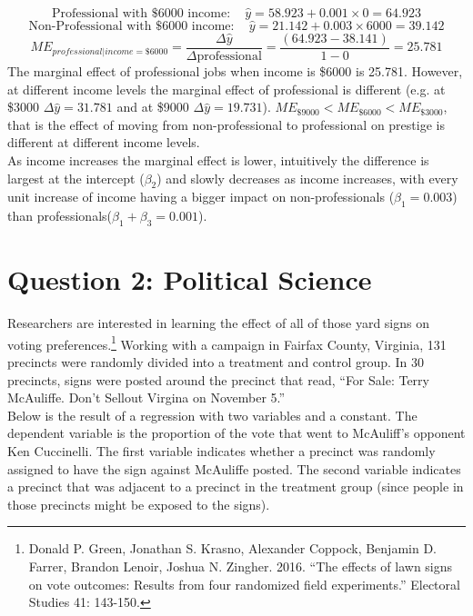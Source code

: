 \documentclass[12pt,letterpaper]{article}
\begin{document}
\begin{enumerate}
	\begin{equation}
		\text{Professional with \$6000 income}: \quad \hat{y} = 58.923 + 0.001 \times 0 = 64.923
	\end{equation}
	\begin{equation}
		\text{Non-Professional with \$6000 income}: \quad \hat{y} = 21.142 + 0.003 \times 6000 = 39.142
	\end{equation}
	\begin{equation}
		ME_{professional|income=\$6000} = \frac{\Delta\hat{y}}{\Delta\text{professional}} = \frac{(64.923-38.141)}{1-0} = 25.781
	\end{equation}
	The marginal effect of professional jobs when income is \$6000 is 25.781. 
	However, at different income levels the marginal effect of professional is different (e.g. at \$3000  $\Delta\hat{y}= 31.781$ and at \$9000 $\Delta\hat{y} = 19.731$).  
	$ ME_{\$9000} < ME_{\$6000} < ME_{\$3000}$, that is the effect of moving from non-professional to professional on prestige is different at different income levels.\\ As income increases the marginal effect is lower, intuitively the difference is largest at the intercept ($\beta_2$) and slowly decreases as income increases, with every unit increase of income having a bigger impact on non-professionals ($\beta_1 = 0.003$) than professionals($\beta_1 + \beta_3 = 0.001$).  
	
	
\end{enumerate}

\newpage

\section*{Question 2: Political Science}
\vspace{.25cm}
\noindent 	Researchers are interested in learning the effect of all of those yard signs on voting preferences.\footnote{Donald P. Green, Jonathan	S. Krasno, Alexander Coppock, Benjamin D. Farrer,	Brandon Lenoir, Joshua N. Zingher. 2016. ``The effects of lawn signs on vote outcomes: Results from four randomized field experiments.'' Electoral Studies 41: 143-150. } Working with a campaign in Fairfax County, Virginia, 131 precincts were randomly divided into a treatment and control group. In 30 precincts, signs were posted around the precinct that read, ``For Sale: Terry McAuliffe. Don't Sellout Virgina on November 5.'' \\

Below is the result of a regression with two variables and a constant.  The dependent variable is the proportion of the vote that went to McAuliff's opponent Ken Cuccinelli. The first variable indicates whether a precinct was randomly assigned to have the sign against McAuliffe posted. The second variable indicates
a precinct that was adjacent to a precinct in the treatment group (since people in those precincts might be exposed to the signs).  \\
\end{document}
